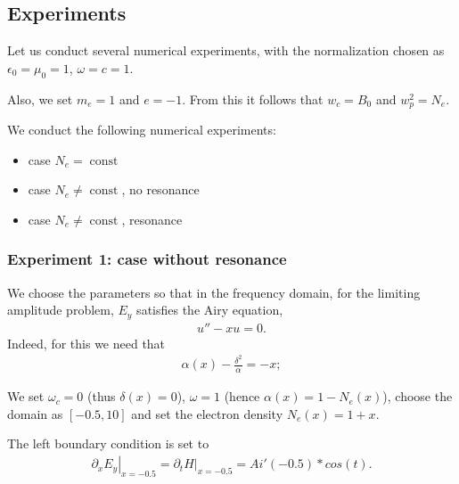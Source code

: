 \documentclass[a4paper,10pt]{article}
\begin{document}
\subsection{Experiments}
Let us conduct several numerical experiments, with the normalization chosen as $\epsilon_0=\mu_0=1$, $\omega=c=1$. 

Also, we set $m_e=1$ and $e=-1$. From this it follows that $w_c=B_0$ and $w_p^2=N_e$. 

We conduct the following numerical experiments:
\begin{itemize}
 \item case $N_e=\operatorname{const}$
 \item case $N_e\neq \operatorname{const}$, no resonance
 \item case $N_e\neq \operatorname{const}$, resonance
\end{itemize}




\subsubsection{Experiment 1: case without resonance}
We choose the parameters so that in the frequency domain, for the limiting amplitude problem, $E_y$ satisfies 
the Airy equation,
\begin{align*}
 u''-xu=0.
\end{align*}
Indeed, for this we need that 
\begin{align*}
 \alpha(x)-\frac{\delta^2}{\alpha}=-x;
\end{align*}

We set $\omega_c=0$ (thus $\delta(x)=0$), $\omega=1$ (hence $\alpha(x)=1-N_e(x)$), 
choose the domain as $[-0.5, 10]$ and set the electron density $N_e(x)=1+x$.

The left boundary condition is set to 
\begin{align*}
 \left.\partial_x E_y\right|_{x=-0.5}=\left.\partial_t H\right|_{x=-0.5}=Ai'(-0.5)*cos(t).
\end{align*}
\begin{figure}
\begin{tikzpicture}
  
\end{tikzpicture}

\end{figure}
\end{document}
